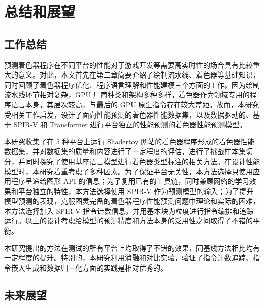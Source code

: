 \chapter{总结和展望}

\section{工作总结}

预测着色器程序在不同平台的性能对于游戏开发等需要高实时性的场合具有比较重大的意义。对此，本文首先在第二章简要介绍了绘制流水线、着色器等基础知识，同时回顾了着色器程序优化、程序语言理解和性能建模三个方面的工作。因为绘制流水线环节相对复杂，GPU 厂商种类和架构多种多样，着色器作为领域专用的程序语言本身，其层次较高，与最后的 GPU 原生指令存在较大差距。故而，本研究受相关工作启发，设计了{\amend 面向性能预测的着色器性能数据集，以及}数据驱动的、基于 SPIR-V 和 Transformer 进行平台独立的性能预测的{\amend 着色器性能预测模型}。

本研究收集了在 5 种平台上运行 Shadertoy 网站的着色器程序形成的着色器性能数据集，并对数据集的质量和内容进行了一定程度的评估{\added ，进行了挑战样本集切分，并同时探究了使用基座语言模型进行着色器类型标注的相关方法。}在设计性能模型时，本研究着重考虑了多种因素。为了保证平台无关性，本方法选择只使用应用程序呈递给图形 API 的信息；为了复用已有的工具链，同时兼顾网络的学习效果和平台独立的特性，本方法选择使用 SPIR-V 作为预测模型的输入；为了提升模型预测的表现，克服图灵完备的着色器程序性能预测问题中理论和实际的困难，本方法选择加入 SPIR-V 指令计数信息，并用基本块为粒度进行指令编排和追踪运行。以上的设计考虑给模型的预测精度和方法本身的泛用性之间取得了不错的平衡。

本研究提出的方法在测试的所有平台上均取得了不错的效果，同基线方法相比均有一定程度的提升。特别的，本研究利用消融和对比实验，验证了指令计数追踪、指令嵌入生成和数据归一化方面的实践是相对优秀的。

\section{未来展望}


